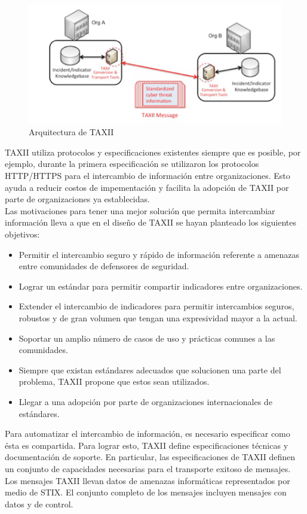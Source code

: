  
\begin{figure}[ht!]
  \centering
    \includegraphics[scale=0.80]{./images/TAXIIArchitecture1.png}
    \caption{Arquitectura de TAXII \protect\cite{b1}}
    \label{fig.diagramabloques}
\end{figure}

TAXII utiliza protocolos y especificaciones existentes siempre que 
es posible, por ejemplo, durante la primera especificación se utilizaron los protocolos HTTP/HTTPS para el intercambio de información entre organizaciones. Esto ayuda a reducir costos de impementación y facilita la adopción de TAXII por parte de organizaciones ya establecidas.\\

Las motivaciones para tener una mejor solución que permita intercambiar 
información lleva a que en el diseño de TAXII se hayan planteado los siguientes 
objetivos:
 \begin{itemize}
   \item Permitir el intercambio seguro y rápido de información referente a 
   amenazas entre comunidades de defensores de seguridad.
   \item Lograr un estándar para permitir compartir indicadores entre organizaciones.
   \item Extender el intercambio de indicadores para permitir intercambios 
   seguros, robustos y de gran volumen que tengan una expresividad mayor a la 
   actual.
   \item Soportar un amplio número de casos de uso y prácticas comunes a las 
   comunidades.
   \item Siempre que existan estándares adecuados que solucionen una parte del problema, TAXII propone que estos sean utilizados.
   \item Llegar a una adopción por parte de organizaciones internacionales de 
   estándares.
 \end{itemize}

Para automatizar el intercambio de información, es necesario especificar como 
ésta es compartida. Para lograr esto, TAXII define especificaciones técnicas y 
documentación de soporte. En particular, las especificaciones de TAXII definen 
un conjunto de capacidades necesarias para el transporte exitoso de mensajes. 
Los mensajes TAXII llevan datos de amenazas informáticas representados por medio de STIX. El conjunto completo de los mensajes incluyen mensajes con datos y 
de control.\\

